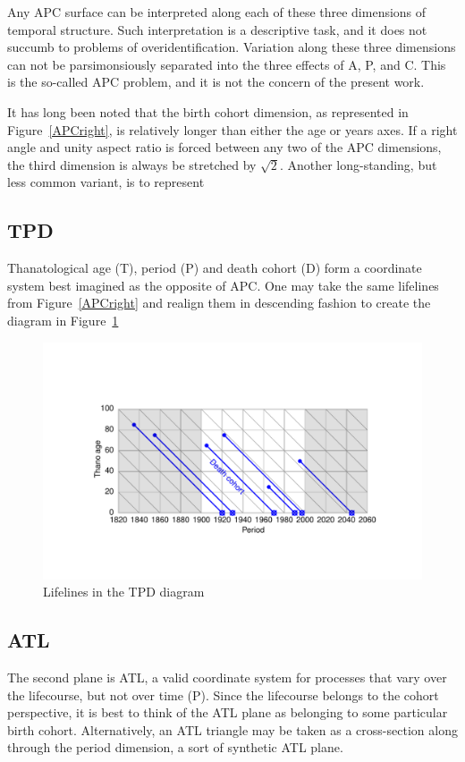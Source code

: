 \documentclass[11pt,oneside]{article} %
\begin{document}
Any APC surface can be interpreted along each of these
three dimensions of temporal structure. Such interpretation is a descriptive
task, and it does not succumb to problems of overidentification. Variation along
these three dimensions can not be parsimonsiously separated into the three
effects of A, P, and C. This is the so-called APC problem, and it is not the concern of the
present work. 

It has long been noted \citep{zeuner1869abhandlungen, perozzo1880della} that the
birth cohort dimension, as represented in Figure~\ref{APCright}, is relatively
longer than either the age or years axes. If a right angle and unity aspect
ratio is forced between any two of the APC dimensions, the third dimension is always be
stretched by $\sqrt{2}$. Another long-standing, but less common variant, is to
represent

\FloatBarrier

\subsection*{TPD}

Thanatological age (T), period (P) and death cohort (D) form a coordinate system
best imagined as the opposite of APC. One may take the same lifelines from
Figure~\ref{APCright} and realign them in descending fashion to create the
diagram in Figure~\ref{TPDright}

\begin{figure}[b!]
    \centering
    \includegraphics[scale=.7]{Figures/LabPres/TPD2.pdf}
    \caption{Lifelines in the TPD diagram}
    \label{TPDright}
\end{figure} 

\subsection*{ATL}
The second plane is ATL, a valid coordinate system for
processes that vary over the lifecourse, but not over time (P). Since the
lifecourse belongs to the cohort perspective, it is best to think of the ATL
plane as belonging to some particular birth cohort. Alternatively, an ATL
triangle may be taken as a cross-section along through the period dimension, a
sort of synthetic ATL plane.
\end{document}
